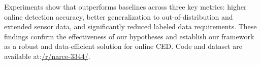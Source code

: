 Experiments show that \narce{} outperforms baselines across three key metrics: higher online detection accuracy, better generalization to out-of-distribution and extended sensor data, and significantly reduced labeled data requirements. These findings confirm the effectiveness of our hypotheses and establish our framework as a robust and data-efficient solution for online CED. Code and dataset are available at:\href{https://anonymous.4open.science/r/narce-3344/}{/r/narce-3344/}.




% 




